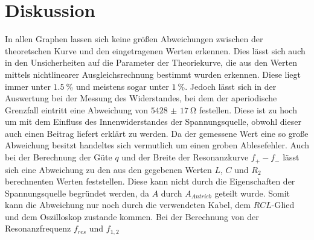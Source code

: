 \section{Diskussion}
\label{sec:Diskussion}

In allen Graphen lassen sich keine größen Abweichungen zwischen der theoretschen Kurve und den eingetragenen Werten erkennen. Dies lässt sich auch in den Unsicherheiten auf die Parameter der Theoriekurve, die aus den Werten mittels nichtlinearer Ausgleichsrechnung bestimmt wurden erkennen. Diese liegt immer unter $\SI{1.5}{\percent}$ und meistens sogar unter $\SI{1}{\percent}$. Jedoch lässt sich in der Auswertung bei der Messung des Widerstandes, bei dem der aperiodische Grenzfall eintritt eine Abweichung von $\SI{5428(17)}{\ohm}$ festellen. Diese ist zu hoch um mit dem Einfluss des Innenwiderstandes der Spannungsquelle, obwohl dieser auch einen Beitrag liefert erklärt zu werden. Da der gemessene Wert eine so große Abweichung besitzt handeltes sich vermutlich um einen groben Ablesefehler. Auch bei der Berechnung der Güte $q$ und der Breite der Resonanzkurve $f_+ - f_-$ lässt sich eine Abweichung zu den aus den gegebenen Werten $L$, $C$ und $R_2$ berechnenten Werten feststellen. Diese kann nicht durch die Eigenschaften der Spannungsquelle begründet werden, da $A$ durch $A_{Antrieb}$ geteilt wurde. Somit kann die Abweichung nur noch durch die verwendeten Kabel, dem $RCL$-Glied und dem Oszilloskop zustande kommen. Bei der Berechnung von der Resonanzfrequenz $f_{res}$ und $f_{1,2}$ 







	
